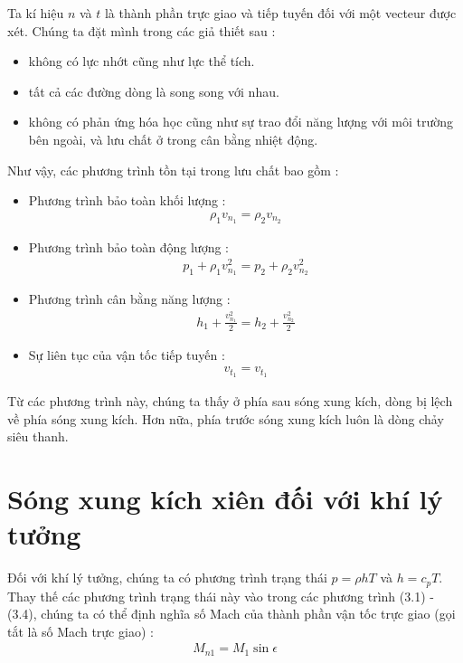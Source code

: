 \documentclass[DONG_CHAY_NEN_DUOC.tex]{subfiles}
\begin{document}
Ta kí hiệu $n$ và $t$ là thành phần trực giao và tiếp tuyến đối với một vecteur được xét. Chúng ta đặt mình trong các giả thiết sau :
\begin{itemize}
	\item không có lực nhớt cũng như lực thể tích.
	\item tất cả các đường dòng là song song với nhau.
	\item không có phản ứng hóa học cũng như sự trao đổi năng lượng với môi trường bên ngoài, và lưu chất ở trong cân bằng nhiệt động.
\end{itemize}

Như vậy, các phương trình tồn tại trong lưu chất bao gồm :
\begin{itemize}
	\item Phương trình bảo toàn khối lượng :
	\begin{equation}
		\begin{aligned}
			\rho_1 v_{n_1} = \rho_2 v_{n_2}
		\end{aligned}
	\end{equation}
	\item Phương trình bảo toàn động lượng :
	\begin{equation}
		\begin{aligned}
			p_1 + \rho_1 v_{n_1}^ 2= p_2 + \rho_2 v_{n_2}^2
		\end{aligned}
	\end{equation}
	\item Phương trình cân bằng năng lượng :
	\begin{equation}
		\begin{aligned}
			h_1 + \frac{v_{n_1}^2}{2}= 	h_2 + \frac{v_{n_2}^2}{2}
		\end{aligned}
	\end{equation}
	\item Sự liên tục của vận tốc tiếp tuyến :
	\begin{equation}
		\begin{aligned}
			v_{t_1} = v_{t_1}
		\end{aligned}
	\end{equation}
\end{itemize}

Từ các phương trình này, chúng ta thấy ở phía sau sóng xung kích, dòng bị lệch về phía sóng xung kích. Hơn nữa, phía trước sóng xung kích luôn là dòng chảy siêu thanh.
\section{Sóng xung kích xiên đối với khí lý tưởng}
Đối với khí lý tưởng, chúng ta có phương trình trạng thái $p =\rho hT$ và $h = c_pT$. Thay thế các phương trình trạng thái này vào trong các phương trình (3.1) - (3.4), chúng ta có thể định nghĩa số Mach của thành phần vận tốc trực giao (gọi tắt là số Mach trực giao) :
\begin{equation}
	\begin{aligned}
		\boxed{
			M_{n1} = M_1 \sin\epsilon
		}
	\end{aligned}
\end{equation}
\end{document}
